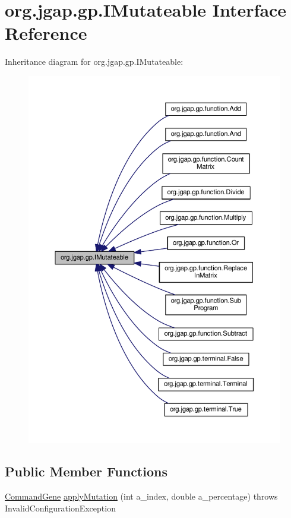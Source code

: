 \hypertarget{interfaceorg_1_1jgap_1_1gp_1_1_i_mutateable}{\section{org.\-jgap.\-gp.\-I\-Mutateable Interface Reference}
\label{interfaceorg_1_1jgap_1_1gp_1_1_i_mutateable}
}


Inheritance diagram for org.\-jgap.\-gp.\-I\-Mutateable\-:
\nopagebreak
\begin{figure}[H]
\begin{center}
\leavevmode
\includegraphics[width=350pt]{interfaceorg_1_1jgap_1_1gp_1_1_i_mutateable__inherit__graph}
\end{center}
\end{figure}
\subsection*{Public Member Functions}
\begin{DoxyCompactItemize}
\item 
\hyperlink{classorg_1_1jgap_1_1gp_1_1_command_gene}{Command\-Gene} \hyperlink{interfaceorg_1_1jgap_1_1gp_1_1_i_mutateable_abe553182ae983c2092495c889eecb2e2}{apply\-Mutation} (int a\-\_\-index, double a\-\_\-percentage)  throws Invalid\-Configuration\-Exception
\end{DoxyCompactItemize}
